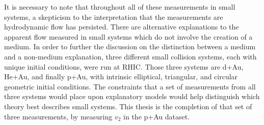 It is necessary to note that throughout all of these measurements in small systems, a skepticism to the interpretation that the measurements are hydrodynamic flow has persisted. There are alternative explanations to the apparent flow measured in small systems which do not involve the creation of a medium. In order to further the discussion on the distinction between a medium and a non-medium explanation, three different small collision systems, each with unique initial conditions, were run at RHIC. Those three systems are d+Au, He+Au, and finally p+Au, with intrinsic  elliptical, triangular, and circular geometric initial conditions. The constraints that a set of measurements from all three systems would place upon explanatory models would help distinguish which theory best describes small systems. This thesis is the completion of that set of three measurements, by measuring $v_2$ in the p+Au dataset.






